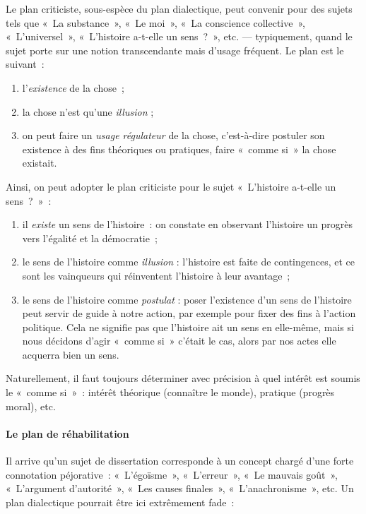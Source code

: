 \documentclass[a4paper]{article}
\begin{document}
Le plan criticiste, sous-espèce du plan dialectique, peut convenir pour
des sujets tels que « La substance », « Le moi », « La conscience
collective », « L'universel », « L'histoire a-t-elle un sens ? », etc. ---
typiquement, quand le sujet porte sur une notion transcendante mais
d'usage fréquent. Le plan est le suivant :

\begin{enumerate}
\item l'\emph{existence} de la chose ;
\item la chose n'est qu'une \emph{illusion} ;
\item on peut faire un \emph{usage régulateur} de la chose, c'est-à-dire
   postuler son existence à des fins théoriques ou pratiques, faire
   « comme si » la chose existait.
\end{enumerate}

Ainsi, on peut adopter le plan criticiste pour le sujet « L'histoire
a-t-elle un sens ? » :

\begin{enumerate}
\item il \emph{existe} un sens de l'histoire : on constate en observant
   l'histoire un progrès vers l'égalité et la démocratie ;
\item le sens de l'histoire comme \emph{illusion} : l'histoire est faite de
   contingences, et ce sont les vainqueurs qui réinventent l'histoire à
   leur avantage ;
\item le sens de l'histoire comme \emph{postulat} : poser l'existence d'un sens
   de l'histoire peut servir de guide à notre action, par exemple pour
   fixer des fins à l'action politique. Cela ne signifie pas que
   l'histoire ait un sens en elle-même, mais si nous décidons d'agir
   « comme si » c'était le cas, alors par nos actes elle acquerra bien un
   sens.
\end{enumerate}

Naturellement, il faut toujours déterminer avec précision à quel intérêt
est soumis le « comme si » : intérêt théorique (connaître le monde),
pratique (progrès moral), etc.
\paragraph{Le plan de réhabilitation}
\label{sec-2-4-2-3}


Il arrive qu'un sujet de dissertation corresponde à un concept chargé
d'une forte connotation péjorative : « L'égoïsme », « L'erreur », « Le
mauvais goût », « L'argument d'autorité », « Les causes finales »,
« L'anachronisme », etc. Un plan dialectique pourrait être ici extrêmement
fade :
\end{document}
